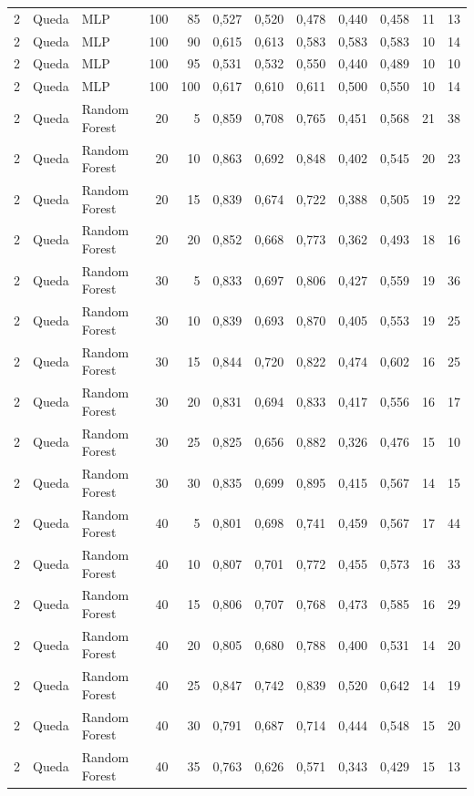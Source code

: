 \begin{longtable}{@{}rllrrrrrrrrr@{}}
2 & Queda & MLP & 100 & 85 & 0,527 & 0,520 & 0,478 & 0,440 & 0,458 & 11 & 13 \\
2 & Queda & MLP & 100 & 90 & 0,615 & 0,613 & 0,583 & 0,583 & 0,583 & 10 & 14 \\
2 & Queda & MLP & 100 & 95 & 0,531 & 0,532 & 0,550 & 0,440 & 0,489 & 10 & 10 \\
2 & Queda & MLP & 100 & 100 & 0,617 & 0,610 & 0,611 & 0,500 & 0,550 & 10 & 14 \\
2 & Queda & Random Forest & 20 & 5 & 0,859 & 0,708 & 0,765 & 0,451 & 0,568 & 21 & 38 \\
2 & Queda & Random Forest & 20 & 10 & 0,863 & 0,692 & 0,848 & 0,402 & 0,545 & 20 & 23 \\
2 & Queda & Random Forest & 20 & 15 & 0,839 & 0,674 & 0,722 & 0,388 & 0,505 & 19 & 22 \\
2 & Queda & Random Forest & 20 & 20 & 0,852 & 0,668 & 0,773 & 0,362 & 0,493 & 18 & 16 \\
2 & Queda & Random Forest & 30 & 5 & 0,833 & 0,697 & 0,806 & 0,427 & 0,559 & 19 & 36 \\
2 & Queda & Random Forest & 30 & 10 & 0,839 & 0,693 & 0,870 & 0,405 & 0,553 & 19 & 25 \\
2 & Queda & Random Forest & 30 & 15 & 0,844 & 0,720 & 0,822 & 0,474 & 0,602 & 16 & 25 \\
2 & Queda & Random Forest & 30 & 20 & 0,831 & 0,694 & 0,833 & 0,417 & 0,556 & 16 & 17 \\
2 & Queda & Random Forest & 30 & 25 & 0,825 & 0,656 & 0,882 & 0,326 & 0,476 & 15 & 10 \\
2 & Queda & Random Forest & 30 & 30 & 0,835 & 0,699 & 0,895 & 0,415 & 0,567 & 14 & 15 \\
2 & Queda & Random Forest & 40 & 5 & 0,801 & 0,698 & 0,741 & 0,459 & 0,567 & 17 & 44 \\
2 & Queda & Random Forest & 40 & 10 & 0,807 & 0,701 & 0,772 & 0,455 & 0,573 & 16 & 33 \\
2 & Queda & Random Forest & 40 & 15 & 0,806 & 0,707 & 0,768 & 0,473 & 0,585 & 16 & 29 \\
2 & Queda & Random Forest & 40 & 20 & 0,805 & 0,680 & 0,788 & 0,400 & 0,531 & 14 & 20 \\
2 & Queda & Random Forest & 40 & 25 & 0,847 & 0,742 & 0,839 & 0,520 & 0,642 & 14 & 19 \\
2 & Queda & Random Forest & 40 & 30 & 0,791 & 0,687 & 0,714 & 0,444 & 0,548 & 15 & 20 \\
2 & Queda & Random Forest & 40 & 35 & 0,763 & 0,626 & 0,571 & 0,343 & 0,429 & 15 & 13 \\

\end{longtable}
